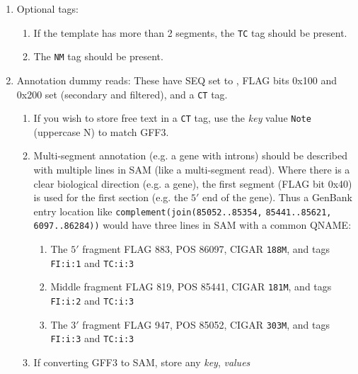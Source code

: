 \documentclass[10pt]{article}
\begin{document}
\begin{enumerate}
\item Optional tags:
  \begin{enumerate}[label=\arabic*]
  \item If the template has more than 2 segments, the {\tt TC} tag
    should be present.
  \item The {\tt NM} tag should be present.
  \end{enumerate}
\item Annotation dummy reads:
  These have {\sf SEQ} set to {\tt *}, {\sf FLAG} bits 0x100 and 0x200
  set (secondary and filtered), and a {\tt CT} tag.
  \begin{enumerate}[label=\arabic*]
  \item If you wish to store free text in a {\tt CT} tag, use the
  \emph{key} value {\tt Note} (uppercase N) to match GFF3.
  \item Multi-segment annotation (e.g. a gene with introns) should be
  described with multiple lines in SAM (like a multi-segment read).
  Where there is a clear biological direction (e.g. a gene), the first
  segment ({\sf FLAG} bit 0x40) is used for the first section (e.g. the
  $5'$ end of the gene). Thus a GenBank entry location like
  {\tt complement(join(85052..85354,} {\tt 85441..85621,} {\tt 6097..86284))}
  would have three lines in SAM with a common {\sf QNAME}: %
    \begin{enumerate}
    \item The $5'$ fragment {\sf FLAG}  883, {\sf POS} 86097, {\sf CIGAR} {\tt 188M}, and tags {\tt FI:i:1} and {\tt TC:i:3} %
    \item Middle fragment {\sf FLAG} 819, {\sf POS} 85441, {\sf CIGAR} {\tt 181M}, and tags {\tt FI:i:2} and {\tt TC:i:3} %
    \item The $3'$ fragment {\sf FLAG} 947, {\sf POS} 85052, {\sf CIGAR} {\tt 303M}, and tags {\tt FI:i:3} and {\tt TC:i:3} %
    \end{enumerate}
  \item If converting GFF3 to SAM, store any \emph{key}, \emph{values}

\end{enumerate}
\end{enumerate}
\end{document}
